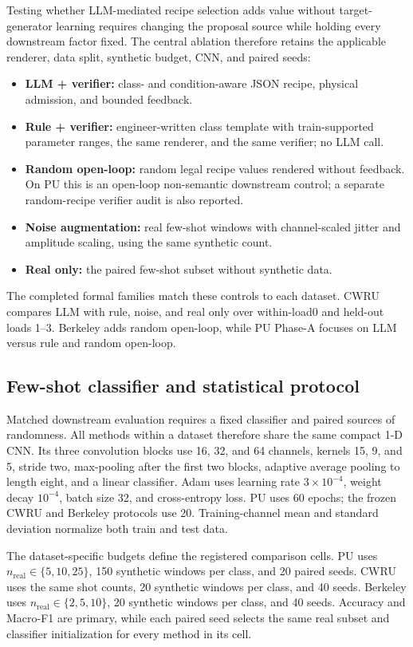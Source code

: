 \documentclass[a4paper,fleqn]{cas-sc}
\begin{document}
Testing whether LLM-mediated recipe selection adds value without target-generator learning
requires changing the proposal source while holding every downstream factor
fixed. The central ablation therefore retains the applicable renderer, data
split, synthetic budget, CNN, and paired seeds:
\begin{itemize}
  \item \textbf{LLM + verifier:} class- and condition-aware JSON recipe,
  physical admission, and bounded feedback.
  \item \textbf{Rule + verifier:} engineer-written class template with
  train-supported parameter ranges, the same renderer, and the same verifier;
  no LLM call.
  \item \textbf{Random open-loop:} random legal recipe values rendered without
  feedback. On PU this is an open-loop non-semantic downstream control; a
  separate random-recipe verifier audit is also reported.
  \item \textbf{Noise augmentation:} real few-shot windows with channel-scaled
  jitter and amplitude scaling, using the same synthetic count.
  \item \textbf{Real only:} the paired few-shot subset without synthetic data.
\end{itemize}
The completed formal families match these controls to each dataset. CWRU
compares LLM with rule, noise, and real only over within-load0 and held-out
loads 1--3. Berkeley adds random open-loop, while PU Phase-A focuses on LLM
versus rule and random open-loop.

\subsection{Few-shot classifier and statistical protocol}

Matched downstream evaluation requires a fixed classifier and paired sources of
randomness. All methods within a dataset therefore share the same compact 1-D
CNN. Its three convolution blocks use 16, 32, and 64 channels, kernels 15, 9,
and 5, stride two, max-pooling after the first two blocks, adaptive average
pooling to length eight, and a linear classifier. Adam uses learning rate
$3\times10^{-4}$, weight decay $10^{-4}$, batch size 32, and cross-entropy
loss. PU uses 60 epochs; the frozen CWRU and Berkeley protocols use 20.
Training-channel mean and standard deviation normalize both train and test
data.

The dataset-specific budgets define the registered comparison cells. PU uses
$n_{\mathrm{real}}\in\{5,10,25\}$, 150 synthetic windows per class, and 20
paired seeds. CWRU uses the same shot counts, 20 synthetic windows per class,
and 40 seeds. Berkeley uses $n_{\mathrm{real}}\in\{2,5,10\}$, 20 synthetic
windows per class, and 40 seeds. Accuracy and Macro-F1 are primary, while each
paired seed selects the same real subset and classifier initialization for
every method in its cell.
\end{document}
